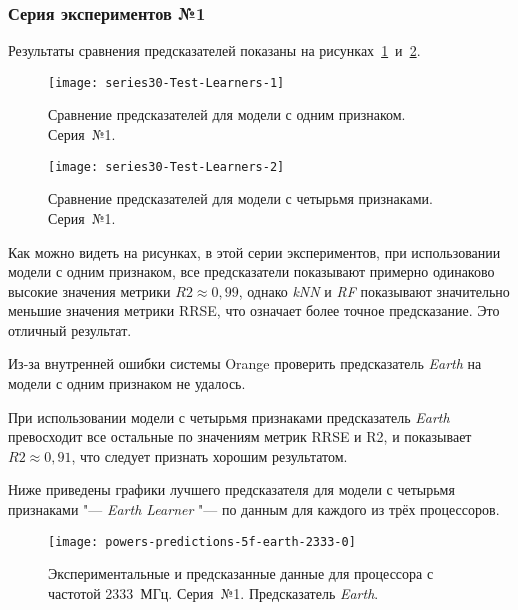 \subsubsection{Серия экспериментов №1}

Результаты сравнения предсказателей показаны на рисунках~\ref{img:series30-Test-Learners-1}~и~\ref{img:series30-Test-Learners-2}.

\begin{figure}[H]
    \begin{center}
            \texttt{[image: series30-Test-Learners-1]}
            \caption{Сравнение предсказателей для модели с одним признаком. Серия~№1.} %
            \label{img:series30-Test-Learners-1} %
    \end{center}
\end{figure}

\begin{figure}[H]
    \begin{center}
            \texttt{[image: series30-Test-Learners-2]}
            \caption{Сравнение предсказателей для модели с четырьмя признаками. Серия~№1.}
            \label{img:series30-Test-Learners-2}
    \end{center}
\end{figure}

Как можно видеть на рисунках, в этой серии экспериментов, при использовании модели с одним признаком, все предсказатели показывают примерно одинаково высокие значения метрики $R2 \approx 0,99$, однако \textit{kNN} и \textit{RF} показывают значительно меньшие значения метрики RRSE, что означает более точное предсказание. Это отличный результат.

Из-за внутренней ошибки системы Orange проверить предсказатель \textit{Earth} на модели с одним признаком не удалось.

При использовании модели с четырьмя признаками предсказатель \textit{Earth} превосходит все остальные по значениям метрик RRSE и R2, и показывает $R2 \approx 0,91$, что следует признать хорошим результатом.

Ниже приведены графики лучшего предсказателя для модели с четырьмя признаками "--- \textit{Earth Learner} "--- по данным для каждого из трёх процессоров.

\begin{figure}[H]
    \begin{center}
        \texttt{[image: powers-predictions-5f-earth-2333-0]}
        \caption{Экспериментальные и предсказанные данные для процессора с частотой 2333~МГц. Серия~№1. Предсказатель \textit{Earth}.}
        \label{img:powers-predictions-5f-earth-2333-0}
    \end{center}
\end{figure}

